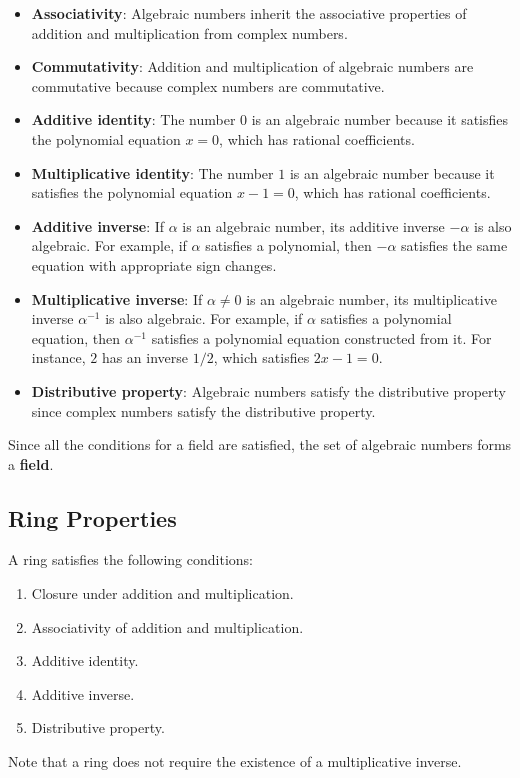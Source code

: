 \documentclass{article}
\newenvironment{proofbox}
  {\begin{mdframed}[linewidth=1pt,linecolor=black,backgroundcolor=white]\noindent\ignorespaces}
  {\end{mdframed}}
\begin{document}
\begin{proofbox}
\begin{itemize}
        \item \textbf{Associativity}: Algebraic numbers inherit the associative properties of addition and multiplication from complex numbers.
        
        \item \textbf{Commutativity}: Addition and multiplication of algebraic numbers are commutative because complex numbers are commutative.
        
        \item \textbf{Additive identity}: The number \( 0 \) is an algebraic number because it satisfies the polynomial equation \( x = 0 \), which has rational coefficients.
        
        \item \textbf{Multiplicative identity}: The number \( 1 \) is an algebraic number because it satisfies the polynomial equation \( x - 1 = 0 \), which has rational coefficients.
        
        \item \textbf{Additive inverse}: If \( \alpha \) is an algebraic number, its additive inverse \( -\alpha \) is also algebraic. For example, if \( \alpha \) satisfies a polynomial, then \( -\alpha \) satisfies the same equation with appropriate sign changes.
        
        \item \textbf{Multiplicative inverse}: If \( \alpha \neq 0 \) is an algebraic number, its multiplicative inverse \( \alpha^{-1} \) is also algebraic. For example, if \( \alpha \) satisfies a polynomial equation, then \( \alpha^{-1} \) satisfies a polynomial equation constructed from it. For instance, \( 2 \) has an inverse \( 1/2 \), which satisfies \( 2x - 1 = 0 \).
        
        \item \textbf{Distributive property}: Algebraic numbers satisfy the distributive property since complex numbers satisfy the distributive property.
    \end{itemize}
    
    Since all the conditions for a field are satisfied, the set of algebraic numbers forms a \textbf{field}.
    
    \subsection*{Ring Properties}
    A ring satisfies the following conditions:
    \begin{enumerate}
        \item Closure under addition and multiplication.
        \item Associativity of addition and multiplication.
        \item Additive identity.
        \item Additive inverse.
        \item Distributive property.
    \end{enumerate}
    Note that a ring does not require the existence of a multiplicative inverse.
    

\end{proofbox}
\end{document}
